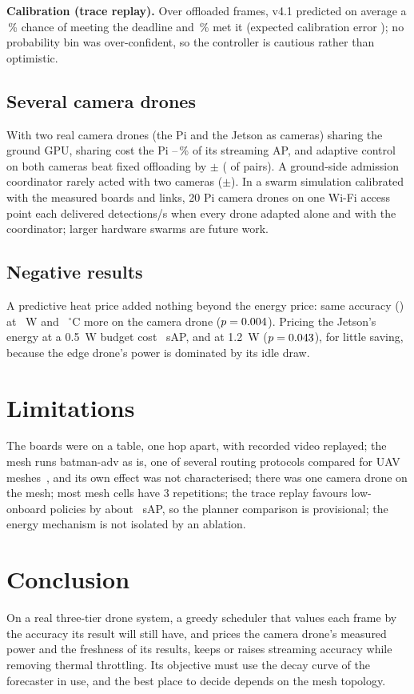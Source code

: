 \documentclass[conference]{IEEEtran}
\begin{document}
\textbf{Calibration (trace replay).} Over \CalFrames{} offloaded frames, v4.1 predicted on average a \CalPred\,\%
chance of meeting the deadline and \CalObs\,\% met it (expected calibration error \CalEce{}); no probability bin was
over-confident, so the controller is cautious rather than optimistic.

\subsection{Several camera drones}\label{sec:swarm}
With two real camera drones (the Pi and the Jetson as cameras) sharing the ground GPU, sharing cost the Pi
\DuoShareLossMin--\DuoShareLossMax\,\% of its streaming AP, and adaptive control on both cameras beat fixed offloading
by \DuoAdaptGain{}$\pm$\DuoAdaptCi{} (\DuoAdaptWins{} of \DuoPairs{} pairs). A ground-side admission coordinator
rarely acted with two cameras (\DuoCoordGain{}$\pm$\DuoCoordCi{}). In a swarm simulation calibrated with the measured
boards and links, 20 Pi camera drones on one Wi-Fi access point each delivered \SwarmTwentyAlone{} detections/s when
every drone adapted alone and \SwarmTwentyCoord{} with the coordinator; larger hardware swarms are future work.

\subsection{Negative results}\label{sec:negative}
A predictive heat price added nothing beyond the energy price: same accuracy (\HeatSap{}) at \HeatW{}~W and
\HeatC{}~$^\circ$C more on the camera drone ($p=0.004{}$). Pricing the Jetson's energy at a 0.5~W budget cost
\JetHalfSap{}~sAP, and at 1.2~W \JetTwelveSap{} ($p=0.043{}$), for little saving, because the edge drone's power is
dominated by its idle draw.

\section{Limitations}
The boards were on a table, one hop apart, with recorded video replayed; the mesh runs batman-adv as is, one of several
routing protocols compared for UAV meshes~\cite{Diniz_2025}, and its own effect was not characterised; there was one
camera drone on the mesh; most
mesh cells have 3 repetitions; the trace replay favours low-onboard policies by about \ReplayLeafBias{}~sAP, so the
planner comparison is provisional; the energy mechanism is not isolated by an ablation.

\section{Conclusion}
On a real three-tier drone system, a greedy scheduler that values each frame by the accuracy its result will still
have, and prices the camera drone's measured power and the freshness of its results, keeps or raises streaming
accuracy while removing thermal throttling. Its objective must use the decay curve of the forecaster in use, and the
best place to decide depends on the mesh topology.



\end{document}

